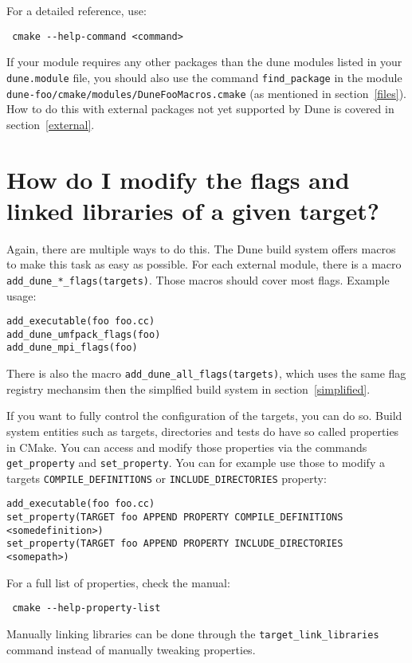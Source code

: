 \documentclass[a4paper,10pt]{scrartcl}
\begin{document}
For a detailed reference, use:
\begin{lstlisting}
 cmake --help-command <command>
\end{lstlisting}

If your module requires any other packages than the dune modules listed in your \lstinline!dune.module! file, you should also use the command \lstinline!find_package! in the module \lstinline!dune-foo/cmake/modules/DuneFooMacros.cmake! (as mentioned in section~\ref{files}). How to do this with external packages not yet supported by Dune is covered in section~\ref{external}.

\section{How do I modify the flags and linked libraries of a given target?}
\label{target}
Again, there are multiple ways to do this. The Dune build system offers macros to make this task as easy as possible. For each external module, there is a macro \lstinline!add_dune_*_flags(targets)!. Those macros should cover most flags. Example usage:
\begin{lstlisting}
add_executable(foo foo.cc)
add_dune_umfpack_flags(foo)
add_dune_mpi_flags(foo)
\end{lstlisting}
There is also the macro \lstinline!add_dune_all_flags(targets)!, which uses the same flag registry mechansim then the simplfied build system in section~\ref{simplified}.

If you want to fully control the configuration of the targets, you can do so. Build system entities such as targets, directories and tests do have so called properties in CMake. You can access and modify those properties via the commands \lstinline!get_property! and \lstinline!set_property!. You can for example use those to modify a targets \lstinline!COMPILE_DEFINITIONS! or \lstinline!INCLUDE_DIRECTORIES! property:
\begin{lstlisting}
add_executable(foo foo.cc)
set_property(TARGET foo APPEND PROPERTY COMPILE_DEFINITIONS <somedefinition>)
set_property(TARGET foo APPEND PROPERTY INCLUDE_DIRECTORIES <somepath>)
\end{lstlisting}
For a full list of properties, check the manual:
\begin{lstlisting}
 cmake --help-property-list
\end{lstlisting}
Manually linking libraries can be done through the \lstinline!target_link_libraries! command instead of manually tweaking properties.
\end{document}
